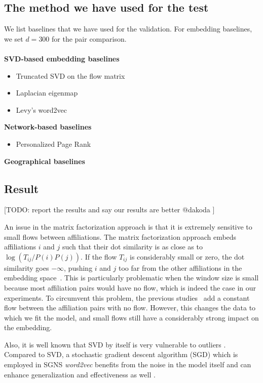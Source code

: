 \documentclass[12pt,a4paper]{article}
\newcommand{\todo}[1]{{\leavevmode\color{orange}[TODO: #1]}}
\begin{document}
\subsection{The method we have used for the test}
We list baselines that we have used for the validation. For embedding baselines, we set $d=300$ for the pair comparison.\\\\
\textbf{SVD-based embedding baselines}
\begin{itemize}
    \item Truncated SVD on the flow matrix
	\item  Laplacian eigenmap
	\item Levy's word2vec
\end{itemize}
\textbf{Network-based baselines}
\begin{itemize}
    \item Personalized Page Rank
\end{itemize}
\textbf{Geographical baselines}

\subsection{Result}
\todo{report the results and say our results are better @dakoda
}


An issue in the matrix factorization approach is that it is extremely sensitive to small flows between affiliations. The matrix factorization approach embeds affiliations $i$ and $j$ such that their dot similarity is as close as to $\log (T_{ij} / P(i) P(j))$. If the flow $T_{ij}$ is considerably small or zero, the dot similarity goes $-\infty$, pushing $i$ and $j$ too far from the other affiliations in the embedding space~\autocite{levy2014neural, Qui2018}. This is particularly problematic when the window size is small because most affiliation pairs would have no flow, which is indeed the case in our experiments. To circumvent this problem, the previous studies~\autocite{levy2014neural, Qui2018} add a constant flow between the affiliation pairs with no flow. However, this changes the data to which we fit the model, and small flows still have a considerably strong impact on the embedding. 

Also, it is well known that SVD by itself is very vulnerable to outliers \autocite{ xu2012robust, huber1981robust, xu1995robust, chandrasekaran2011rank, candes2011robust, }. Compared to SVD, a stochastic gradient descent algorithm (SGD) which is employed in SGNS \textit{word2vec} benefits from the noise in the model itself and can enhance generalization and effectiveness as well \autocite{ma2018power, smith2020generalization, zhang2019algorithmic,}.
\end{document}
